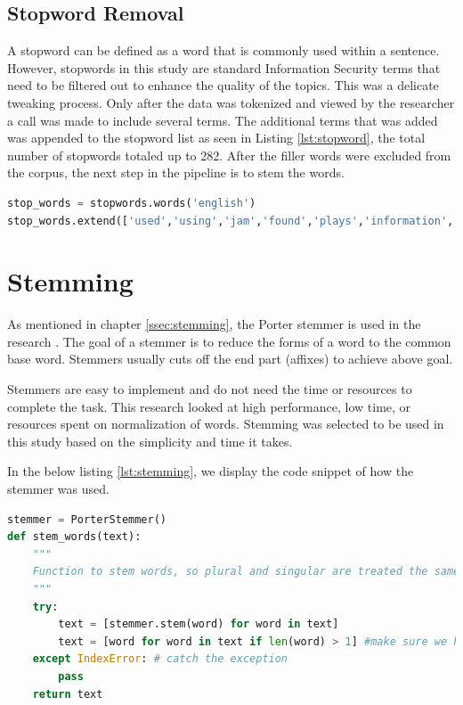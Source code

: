 \subsection{Stopword Removal}
A stopword can be defined as a word that is commonly used within a sentence. However, stopwords in this study are standard Information Security terms that need to be filtered out to enhance the quality of the topics. This was a delicate tweaking process. Only after the data was tokenized and viewed by the researcher a call was made to include several terms. The additional terms that was added was appended to the stopword list as seen in Listing \ref{lst:stopword}, the total number of stopwords totaled up to 282. After the filler words were excluded from the corpus, the next step in the pipeline is to stem the words.
\begin{lstlisting}[language=Python,label={lst:stopword}, caption=stopwords code]
stop_words = stopwords.words('english')
stop_words.extend(['used','using','jam','found','plays','information','security','network', 'technology', 'bgp'])
\end{lstlisting}

\section{Stemming}
As mentioned in chapter \ref{ssec:stemming}, the Porter stemmer is used in the research \cite{porter1980algorithm}. The goal of a stemmer is to reduce the forms of a word to the common base word. Stemmers usually cuts off the end part (affixes) to achieve above goal. 

Stemmers are easy to implement and do not need the time or resources to complete the task. This research looked at high performance, low time, or resources spent on normalization of words. Stemming was selected to be used in this study based on the simplicity and time it takes.

In the below listing \ref{lst:stemming}, we display the code snippet of how the stemmer was used.

\begin{lstlisting}[language=Python, label={lst:stemming}, caption=Stemming the corpus]
stemmer = PorterStemmer()
def stem_words(text):
    """
    Function to stem words, so plural and singular are treated the same
    """
    try:
        text = [stemmer.stem(word) for word in text]
        text = [word for word in text if len(word) > 1] #make sure we have no 1 letter words
    except IndexError: # catch the exception
        pass
    return text

\end{lstlisting}

